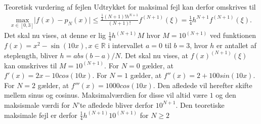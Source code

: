
\begin{frame}{Teoretisk vurdering af fejlen}
    Udtrykket for maksimal fejl kan derfor omskrives til
    \begin{align*}
    \underset{x \in \left [0,3 \right ]}{\text{max}} \lvert f(x)-p_N(x) \rvert \leq \frac{\frac{1}{4}(N+1)!h^{N+1}}{(N+1)!}f^{(N+1)}(\xi)=\frac{1}{4}h^{N+1}f^{(N+1)}(\xi).
    \end{align*}
    Det skal nu vises, at denne er lig $\frac{1}{4}h^{(N+1)}M$ hvor $M=10^{(N+1)}$ ved funktionen $f(x)=x^2-\sin(10x), x \in \mathbb{R}$ i intervallet $a=0$ til $b=3$, hvor $h$ er antallet af steplength, bliver $h=abs(b-a)/N$. 
    Det skal nu vises, at $f(x)^{(N+1)}(\xi)$ kan omskrives til $M=10^{(N+1)}$.
    For $N=0$ gælder, at $f'(x)=2x-10cos(10x)$.
    For $N=1$ gælder, at $f''(x)=2+100sin(10x)$.
    For $N=2$ gælder, at $f'''(x)=1000cos(10x)$. 
    Den afledede vil herefter skifte mellem sinus og cosinus.
    Maksimalværdien for disse vil altid være $1$ og den maksismale værdi for $N$'te afledede bliver derfor $10^{N+1}$.
    Den teoretiske maksimale fejl er derfor $\frac{1}{4}h^{(N+1)}10^{(N+1)}$ for $N \geq 2$
\end{frame}